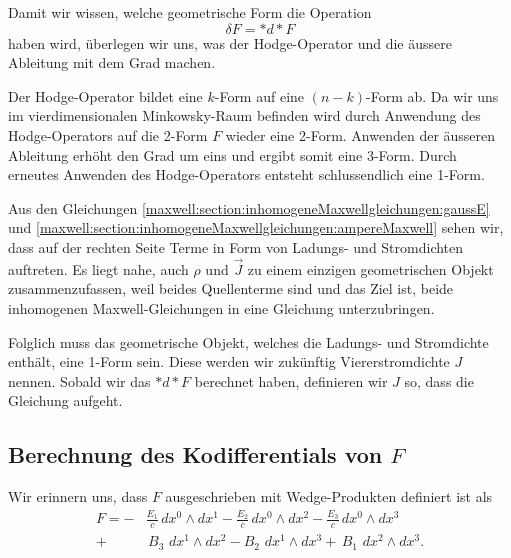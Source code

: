 Damit wir wissen, welche geometrische Form die Operation 
\begin{equation*}
	\delta F = \ast d{\ast} F
\end{equation*}
haben wird, überlegen wir uns, was der Hodge-Operator und die äussere Ableitung mit dem Grad machen.

Der Hodge-Operator bildet eine $k$-Form auf eine $(n-k)$-Form ab.
Da wir uns im vierdimensionalen Minkowsky-Raum befinden wird durch Anwendung des Hodge-Operators auf die 2-Form $F$ wieder eine 2-Form.
Anwenden der äusseren Ableitung erhöht den Grad um eins und ergibt somit eine 3-Form.
Durch erneutes Anwenden des Hodge-Operators entsteht schlussendlich eine 1-Form.

Aus den Gleichungen \eqref{maxwell:section:inhomogeneMaxwellgleichungen:gaussE} und \eqref{maxwell:section:inhomogeneMaxwellgleichungen:ampereMaxwell} sehen wir, dass auf der rechten Seite Terme in Form von Ladungs- und Stromdichten auftreten.
Es liegt nahe, auch $\rho$ und $\vec{J}$ zu einem einzigen geometrischen Objekt zusammenzufassen, weil beides Quellenterme sind und das Ziel ist, beide inhomogenen Maxwell-Gleichungen in eine Gleichung unterzubringen.

Folglich muss das geometrische Objekt, welches die Ladungs- und Stromdichte enthält, eine 1-Form sein.
Diese werden wir zukünftig Viererstromdichte $J$ nennen.
Sobald wir das $\ast d {\ast} F$ berechnet haben, definieren wir $J$ so, dass die Gleichung aufgeht.

\subsection{Berechnung des Kodifferentials von $F$}

Wir erinnern uns, dass $F$ ausgeschrieben mit Wedge-Produkten definiert ist als
\begin{align*}
	F = 
	- &\frac{E_{1}}{c} \, dx^0 \wedge dx^1 - \frac{E_{2}}{c} \, dx^0 \wedge dx^2 - \frac{E_{3}}{c} \, dx^0 \wedge dx^3 \\
	+ & \, B_3 \, \, dx^1 \wedge dx^2 - B_2 \, \, dx^1 \wedge dx^3 + \, B_1 \, \, dx^2 \wedge dx^3.
\end{align*}

